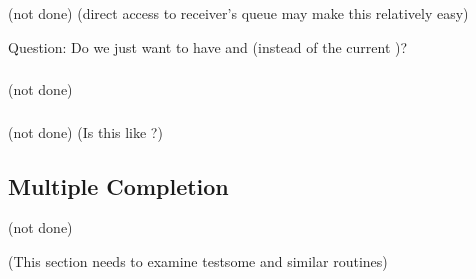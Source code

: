 \ifcodefirst
\else
{}
\fi

\subsubsection{\shmemname}
(not done)
(direct access to receiver's queue may make this relatively easy)

Question: Do we just want to have 
and  (instead of the current
)? 

\subsubsection{\shmemallname}
(not done)

\subsubsection{\vianame}
(not done)
(Is this like \tcpname?)

\subsection{Multiple Completion}
(not done)

(This section needs to examine testsome and similar routines)

